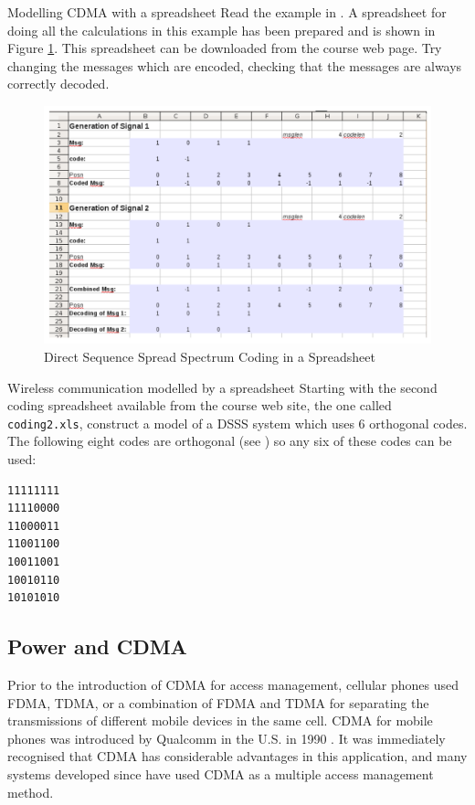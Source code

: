\begin{sbexample}{Modelling CDMA with a spreadsheet}%
Read the example in \cite{cdmawiki}. A spreadsheet for doing all the
calculations in this example has been prepared and is shown in Figure
\ref{cdmaspread}. This spreadsheet can be downloaded from the course
web page. Try changing the messages which are encoded, checking that
the messages are always correctly decoded.

\begin{figure}
\begin{center}
\includegraphics[width=15 cm]{cdmaspreadsheet.png}
\caption{Direct Sequence Spread Spectrum Coding in a Spreadsheet}\label{cdmaspread}
\end{center}
\end{figure}
\end{sbexample}

\begin{exercise}{Wireless communication modelled by a spreadsheet}
Starting with the second coding spreadsheet available from the course
web site, the one called \verb|coding2.xls|, construct a model of a
DSSS system which uses 6 orthogonal codes. The following eight codes
are orthogonal (see \cite{wolframwalsh}) so any six of these codes can
be used:

\begin{verbatim}
11111111
11110000
11000011
11001100
10011001
10010110
10101010
\end{verbatim}

\end{exercise}

\subsection{Power and CDMA}
Prior to the introduction of CDMA for access management, cellular
phones used FDMA, TDMA, or a combination of FDMA and TDMA for
separating the transmissions of different mobile devices in the same
cell. CDMA for mobile phones was introduced by Qualcomm in the U.S. in
1990 \cite{qualcommwiki}. It was immediately recognised that CDMA has
considerable advantages in this application, and many systems developed
since have used CDMA as a multiple access management method.

